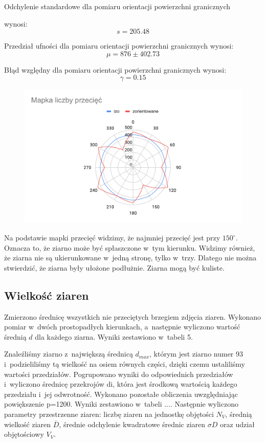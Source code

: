 \documentclass[a4paper,12pt]{article}
\begin{document}


Odchylenie standardowe dla pomiaru orientacji powierzchni granicznych 

wynosi:
$$s=205.48$$

Przedział ufności dla pomiaru orientacji powierzchni granicznych wynosi:
$$\mu = 876\pm 402.73$$

Błąd względny dla pomiaru orientacji powierzchni granicznych wynosi:
$$\gamma = 0.15$$
\newline

\begin{figure}[H]
    \centering
    \includegraphics[width=\textwidth]{img/Mapka liczby przecięć.pdf}
\end{figure}


Na podstawie mapki przecięć widzimy, że najmniej przecięć jest przy $150^{\circ}$. Oznacza to, że ziarno może być spłaszczone w~tym kierunku. Widzimy również, że ziarna nie są ukierunkowane w~jedną stronę, tylko w~trzy. Dlatego nie można stwierdzić, że ziarna były ułożone podłużnie.  
Ziarna mogą być kuliste.
\newpage

\subsection{Wielkość ziaren}

Zmierzono średnicę wszystkich nie przeciętych brzegiem zdjęcia ziaren. Wykonano pomiar w~dwóch prostopadłych kierunkach, a~następnie wyliczono wartość średnią $d$ dla każdego ziarna. Wyniki zestawiono w~tabeli 5.

Znaleźliśmy ziarno z~największą średnicą $d_{max}$, którym jest ziarno numer 93 i~podzieliliśmy tą wielkość na osiem równych części, dzięki czemu ustaliliśmy wartości przedziałów. Pogrupowano wyniki do odpowiednich przedziałów i~wyliczono średnicę przekrojów di, która jest środkową wartością każdego przedziału i~jej odwrotność. Wykonano pozostałe obliczenia uwzględniając powiększenie p=1200. Wyniki zestawiono w~tabeli ....
Następnie wyliczono parametry przestrzenne ziaren: liczbę ziaren na jednostkę objętości $N_V$, średnią wielkość ziaren $\overline{D}$, średnie odchylenie kwadratowe średnic ziaren $\sigma D$ oraz udział objętościowy $V_V$.
\end{document}
